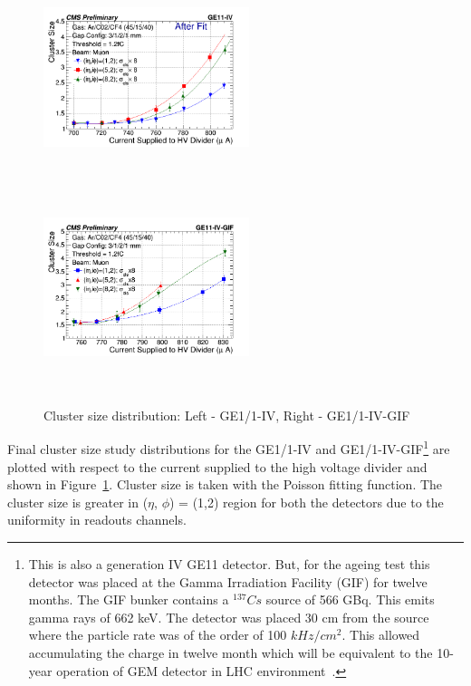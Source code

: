 \begin{figure}[!htbp]
   \begin{center}
     \includegraphics[width=6cm,height=6cm]{figures/GEM/CurrentvsClusterSizeAll3EtaPhi.png}%
     \includegraphics[width=6cm,height=6cm]{figures/GEM/CurrentvsClusterSizeAll3EtaPhiGE11IVGIF.png}
   \end{center}
   \caption{Cluster size distribution: Left - GE1/1-IV, Right - GE1/1-IV-GIF}
   \label{fig:CSDGE1/1}
\end{figure}
Final cluster size study distributions for the GE1/1-IV and GE1/1-IV-GIF\footnote{This is also a generation IV GE11 detector. But, for the ageing test this detector was placed at the Gamma Irradiation Facility (GIF) for twelve months. The GIF bunker contains a $^{137}Cs$ source of 566 GBq. This emits gamma rays of 662 keV. The detector was placed 30 cm from the source where the particle rate was of the order of 100 $kHz/cm^2$. This allowed accumulating the charge in twelve month which will be equivalent to the 10-year operation of GEM detector in LHC environment~\cite{Merlin2013}.} are plotted with respect to the current supplied to the high voltage divider and shown in Figure~\ref{fig:CSDGE1/1}.
Cluster size is taken with the Poisson fitting function. The cluster size is greater in ($\eta$, $\phi$) = (1,2) region for both the detectors due to the uniformity in readouts channels.

